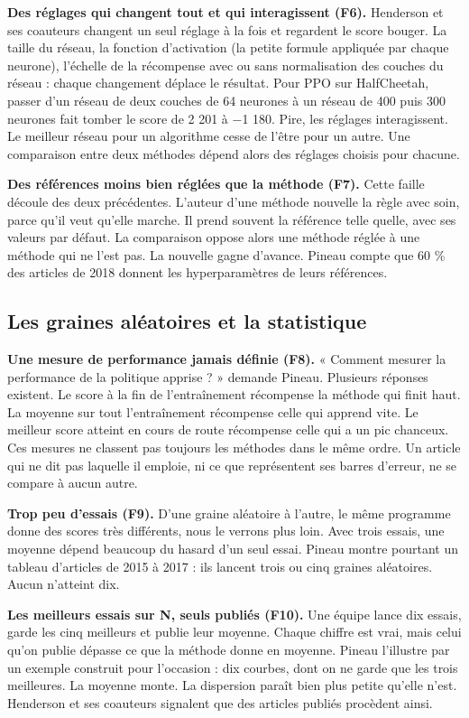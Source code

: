 \documentclass[11pt,a4paper]{article}
\begin{document}
\textbf{Des réglages qui changent tout et qui interagissent (F6).}
Henderson et ses coauteurs changent un seul réglage à la fois et
regardent le score bouger. La taille du réseau, la fonction d'activation
(la petite formule appliquée par chaque neurone), l'échelle de la
récompense avec ou sans normalisation des couches du réseau : chaque
changement déplace le résultat. Pour PPO sur HalfCheetah, passer d'un
réseau de deux couches de 64 neurones à un réseau de 400 puis 300
neurones fait tomber le score de 2 201 à −1 180. Pire, les réglages
interagissent. Le meilleur réseau pour un algorithme cesse de l'être
pour un autre. Une comparaison entre deux méthodes dépend alors des
réglages choisis pour chacune.

\textbf{Des références moins bien réglées que la méthode (F7).} Cette
faille découle des deux précédentes. L'auteur d'une méthode nouvelle la
règle avec soin, parce qu'il veut qu'elle marche. Il prend souvent la
référence telle quelle, avec ses valeurs par défaut. La comparaison
oppose alors une méthode réglée à une méthode qui ne l'est pas. La
nouvelle gagne d'avance. Pineau compte que 60 \% des articles de 2018
donnent les hyperparamètres de leurs références.

\subsection{Les graines aléatoires et la
statistique}\label{les-graines-aluxe9atoires-et-la-statistique}

\textbf{Une mesure de performance jamais définie (F8).} « Comment
mesurer la performance de la politique apprise ? » demande Pineau.
Plusieurs réponses existent. Le score à la fin de l'entraînement
récompense la méthode qui finit haut. La moyenne sur tout l'entraînement
récompense celle qui apprend vite. Le meilleur score atteint en cours de
route récompense celle qui a un pic chanceux. Ces mesures ne classent
pas toujours les méthodes dans le même ordre. Un article qui ne dit pas
laquelle il emploie, ni ce que représentent ses barres d'erreur, ne se
compare à aucun autre.

\textbf{Trop peu d'essais (F9).} D'une graine aléatoire à l'autre, le
même programme donne des scores très différents, nous le verrons plus
loin. Avec trois essais, une moyenne dépend beaucoup du hasard d'un seul
essai. Pineau montre pourtant un tableau d'articles de 2015 à 2017 : ils
lancent trois ou cinq graines aléatoires. Aucun n'atteint dix.

\textbf{Les meilleurs essais sur N, seuls publiés (F10).} Une équipe
lance dix essais, garde les cinq meilleurs et publie leur moyenne.
Chaque chiffre est vrai, mais celui qu'on publie dépasse ce que la
méthode donne en moyenne. Pineau l'illustre par un exemple construit
pour l'occasion : dix courbes, dont on ne garde que les trois
meilleures. La moyenne monte. La dispersion paraît bien plus petite
qu'elle n'est. Henderson et ses coauteurs signalent que des articles
publiés procèdent ainsi.
\end{document}
